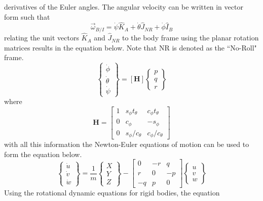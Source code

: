 \documentclass{article}
\begin{document}
derivatives of the Euler angles. The angular velocity can be written
in vector form such that
\begin{equation}
\vec{\omega}_{B/I} = \dot{\psi} \hat{K}_A + \dot{\theta} \hat{J}_{NR} +
\dot{\phi} \hat{I}_B
\end{equation}
relating the unit vectors $\hat{K}_A$ and $\hat{J}_{NR}$ to the body
frame using the planar rotation matrices results in the equation
below. Note that NR is denoted as the ``No-Roll" frame.
\begin{equation}\label{e:ptpdot}
\begin{Bmatrix} \dot{\phi} \\ \dot{\theta} \\ \dot{\psi} \end{Bmatrix}
= [\textbf{H}]
\begin{Bmatrix} p\\q\\r\end{Bmatrix}
\end{equation}
where
\begin{equation}
\textbf{H}=\begin{bmatrix} 1 & s_{\phi}t_{\theta} & c_{\phi}t_{\theta} \\ 0 &
c_{\phi} & -s_{\phi} \\ 0 & s_{\phi}/c_{\theta} &
c_{\phi}/c_{\theta} \end{bmatrix}
\end{equation}
with all this information the Newton-Euler equations of motion can be
used to form the equation below.
\begin{equation}\label{e:uvwdot} 
\begin{Bmatrix} \dot{u} \\ \dot{v} \\ \dot{w} \end{Bmatrix} = 
\frac{1}m \begin{Bmatrix} X\\Y\\Z\end{Bmatrix}-\begin{bmatrix} 0 & -r
& q \\ r & 0 & -p \\ -q & p & 0 \end{bmatrix} \begin{Bmatrix} u\\v\\w\end{Bmatrix}
\end{equation}
Using the rotational dynamic equations for rigid bodies, the equation
\end{document}
